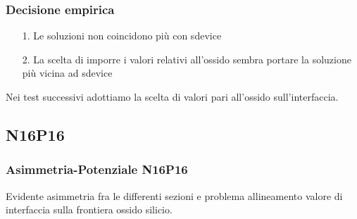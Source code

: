 \begin{frame}
\frametitle{Decisione empirica}
\begin{itemize}
\item[1.] Le soluzioni non coincidono pi\`u con sdevice
\item[2.] La scelta di imporre i valori relativi all'ossido sembra portare la soluzione pi\`u vicina ad sdevice 
\end{itemize}
Nei test successivi adottiamo la scelta di valori pari all'ossido sull'interfaccia.
\end{frame}

\subsection{N16P16}
\begin{frame}
\tableofcontents[currentsection]
\end{frame}

\begin{frame}
\frametitle{Asimmetria-Potenziale N16P16}
Evidente asimmetria fra le differenti sezioni e problema allineamento valore di interfaccia sulla frontiera ossido silicio.
\begin{columns}

\begin{column}{0.3 \textwidth}
\begin{center}
\begin{figure}[!h]
          \end{figure}
\end{center}
\end{column}

\begin{column}{0.3 \textwidth}
\begin{center}
\begin{figure}[!h]
\end{figure}
\end{center}
\end{column}

\begin{column}{0.3 \textwidth}
\begin{center}
\begin{figure}[!h]
\end{figure}
\end{center}
\end{column}

\end{columns}

\end{frame}



